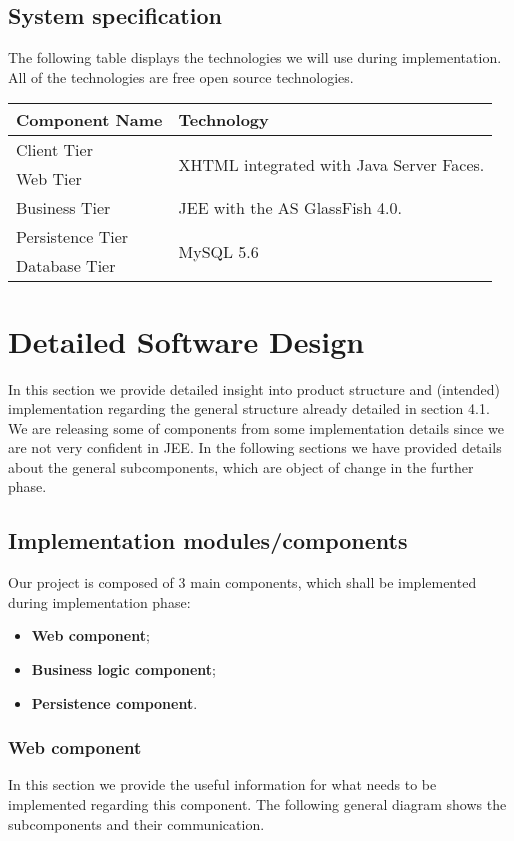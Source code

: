 \documentclass[a4paper,12pt]{book}
\begin{document}
\section{System specification}
The following table displays the technologies we will use during implementation. All of the technologies are free open source technologies.
\begin{center}
  \begin{tabular}{ | p{5cm} | p{10cm} | }
    \hline
    \textbf{Component Name} & \textbf{Technology} \\ \hline
    Client Tier & \multirow{2}{*}{XHTML integrated with Java Server Faces.} \\
    Web Tier & \\ \hline
    Business Tier & JEE with the AS GlassFish 4.0. \\ \hline
    Persistence Tier & \multirow{2}{*}{MySQL 5.6} \\
    Database Tier & \\ \hline
  \end{tabular}
\end{center}

\chapter{Detailed Software Design}
In this section we provide detailed insight into product structure and (intended) implementation regarding the general structure already detailed in section 4.1. We are releasing some of components from some implementation details since we are not very confident in JEE. In the following sections we have provided details about the general subcomponents, which are object of change in the further phase.

\section{Implementation modules/components}
Our project is composed of 3 main components, which shall be implemented during implementation phase:
\begin{itemize}
  \item \textbf{Web component};
  \item \textbf{Business logic component};
  \item \textbf{Persistence component}.
\end{itemize}

\subsection{Web component}
In this section we provide the useful information for what needs to be implemented regarding this component. The following general diagram shows the subcomponents and their communication.
\end{document}
